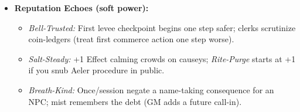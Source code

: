 \begin{itemize}
  \item \textbf{Reputation Echoes (soft power):}
  \begin{itemize}
    \item \emph{Bell-Trusted:} First levee checkpoint begins one step safer; clerks scrutinize coin-ledgers (treat first commerce action one step worse).
    \item \emph{Salt-Steady:} +1 Effect calming crowds on causeys; \emph{Rite-Purge} starts at +1 if you snub Aeler procedure in public.
    \item \emph{Breath-Kind:} Once/session negate a name-taking consequence for an NPC; mist remembers the debt (GM adds a future call-in).
  \end{itemize}
\end{itemize}